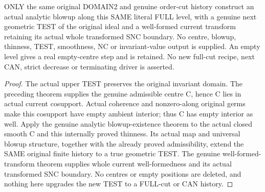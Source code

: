 \begin{theorem}
\label{hir:original-order-cut-finite-positive-full-level-blowup}
\leanok
ONLY the same original DOMAIN2 and genuine order-cut history construct an
actual analytic blowup along this SAME literal FULL level, with a genuine
next geometric TEST of the original ideal and a well-formed current transform
retaining its actual whole transformed SNC boundary. No centre, blowup,
thinness, TEST, smoothness, NC or invariant-value output is supplied. An empty
level gives a real empty-centre step and is retained. No new full-cut recipe,
next CAN, strict decrease or terminating driver is asserted.
\end{theorem}
\begin{proof}
The actual upper TEST preserves the original invariant domain. The preceding
theorem supplies the genuine admissible centre C, hence C lies in actual
current cosupport. Actual coherence and nonzero-along original germs make
this cosupport have empty ambient interior; thus C has empty interior as well.
Apply the genuine analytic blowup-existence theorem to the actual closed
smooth C and this internally proved thinness. Its actual map and universal
blowup structure, together with the already proved admissibility, extend the
SAME original finite history to a true geometric TEST. The genuine
well-formed-transform theorem supplies whole current well-formedness and
its actual transformed SNC boundary. No centres or empty positions are
deleted, and nothing here upgrades the new TEST to a FULL-cut or CAN history.
\end{proof}
